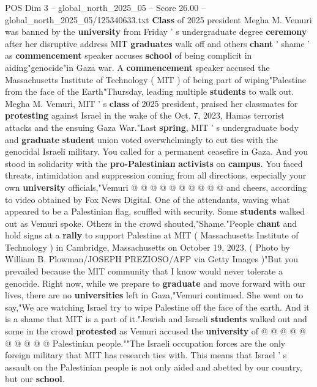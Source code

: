 \begin{textsample}{POS Dim 3 – global\_north\_2025\_05 – Score 26.00 – global\_north\_2025\_05/125340633.txt}  \label{ex:f3_pos_147}
\textbf{Class} of 2025 president Megha M.
Vemuri was banned by the \textbf{university} from Friday ' s undergraduate degree \textbf{ceremony} after her disruptive address MIT \textbf{graduates} walk off and others \textbf{chant} ' shame ' as \textbf{commencement} speaker accuses \textbf{school} of being complicit in aiding"genocide"in Gaza war.
A \textbf{commencement} speaker accused the Massachusetts Institute of Technology ( MIT ) of being part of wiping"Palestine from the face of the Earth"Thursday, leading multiple \textbf{students} to walk out.
Megha M.
Vemuri, MIT ' s \textbf{class} of 2025 president, praised her classmates for \textbf{protesting} against Israel in the wake of the Oct. 7, 2023, Hamas terrorist attacks and the ensuing Gaza War."Last \textbf{spring}, MIT ' s undergraduate body and \textbf{graduate} \textbf{student} union voted overwhelmingly to cut ties with the genocidal Israeli military.
You called for a permanent ceasefire in Gaza.
And you stood in solidarity with the \textbf{pro-Palestinian} \textbf{activists} on \textbf{campus}.
You faced threats, intimidation and suppression coming from all directions, especially your own \textbf{university} officials,"Vemuri @ @ @ @ @ @ @ @ @ @ and cheers, according to video obtained by Fox News Digital.
One of the attendants, waving what appeared to be a Palestinian flag, scuffled with security.
Some \textbf{students} walked out as Vemuri spoke.
Others in the crowd shouted,"Shame."People \textbf{chant} and hold signs at a \textbf{rally} to support Palestine at MIT ( Massachusetts Institute of Technology ) in Cambridge, Massachusetts on October 19, 2023. ( Photo by William B.
Plowman/JOSEPH PREZIOSO/AFP via Getty Images )"But you prevailed because the MIT community that I know would never tolerate a genocide.
Right now, while we prepare to \textbf{graduate} and move forward with our lives, there are no \textbf{universities} left in Gaza,"Vemuri continued.
She went on to say,"We are watching Israel try to wipe Palestine off the face of the earth.
And it is a shame that MIT is a part of it."Jewish and Israeli \textbf{students} walked out and some in the crowd \textbf{protested} as Vemuri accused the \textbf{university} of @ @ @ @ @ @ @ @ @ @ Palestinian people.""The Israeli occupation forces are the only foreign military that MIT has research ties with.
This means that Israel ' s assault on the Palestinian people is not only aided and abetted by our country, but our \textbf{school}.

\end{textsample}
